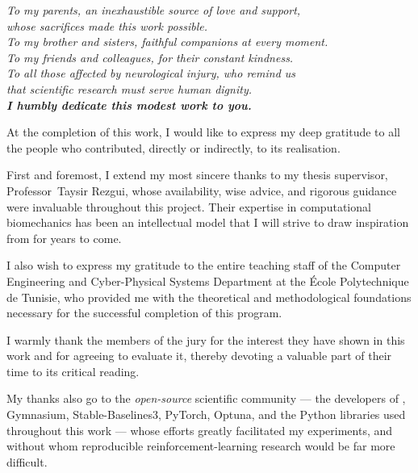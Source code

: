 \cleardoublepage
\thispagestyle{empty}
\vspace*{5cm}
\begin{flushright}
\itshape\large
To my parents, an inexhaustible source of love and support,\\[4pt]
whose sacrifices made this work possible.\\[8pt]
To my brother and sisters, faithful companions at every moment.\\[8pt]
To my friends and colleagues, for their constant kindness.\\[8pt]
To all those affected by neurological injury, who remind us\\
that scientific research must serve human dignity.\\[16pt]
\normalsize\bfseries\color{black} I humbly dedicate this modest work to you.
\end{flushright}


At the completion of this work, I would like to express my deep gratitude to all the
people who contributed, directly or indirectly, to its realisation.

First and foremost, I extend my most sincere thanks to my thesis supervisor,
Professor~Taysir Rezgui, whose availability, wise advice, and rigorous guidance were
invaluable throughout this project. Their expertise in computational biomechanics has been an intellectual model that I will strive to draw inspiration from for years to come.

I also wish to express my gratitude to the entire teaching staff of the Computer
Engineering and Cyber-Physical Systems Department at the École Polytechnique de Tunisie,
who provided me with the theoretical and methodological foundations necessary for the
successful completion of this program.

I warmly thank the members of the jury for the interest they have shown in this work
and for agreeing to evaluate it, thereby devoting a valuable part of their time to its
critical reading.

My thanks also go to the \textit{open-source} scientific community --- the developers of
\MuJoCo{}, Gymnasium, Stable-Baselines3, PyTorch, Optuna, and the Python libraries used
throughout this work --- whose efforts greatly facilitated my experiments, and without
whom reproducible reinforcement-learning research would be far more difficult.

